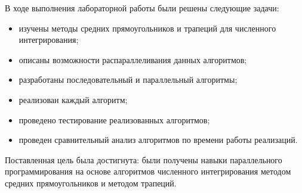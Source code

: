 \vspace{\baselineskip}

В ходе выполнения лабораторной работы были решены следующие задачи:

\begin{itemize}[label=---]
    \item изучены методы средних прямоугольников и трапеций для численного интегрирования;
    \item описаны возможности распараллеливания данных алгоритмов;
    \item разработаны последовательный и параллельный алгоритмы;
    \item реализован каждый алгоритм;
    \item проведено тестирование реализованных алгоритмов;
    \item проведен сравнительный анализ алгоритмов по времени работы
          реализаций.
\end{itemize}

Поставленная цель была достигнута: были получены навыки параллельного программирования на основе алгоритмов численного интегрирования методом средних прямоугольников и методом трапеций.